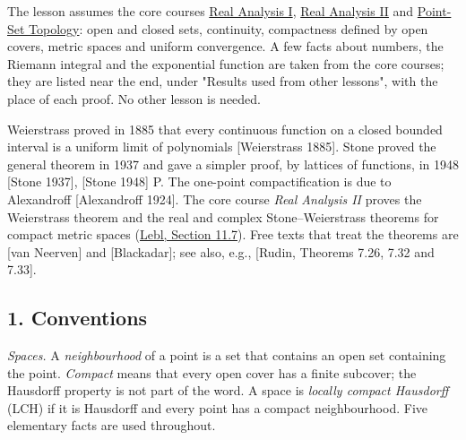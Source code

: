 \documentclass[
  english,
  11pt,
  a4paper,
]{article}
\begin{document}
The lesson assumes the core courses
\href{https://kokunoyumeto.github.io/program-matematika-indonesia/en/\#course-C10}{Real
Analysis I},
\href{https://kokunoyumeto.github.io/program-matematika-indonesia/en/\#course-C20}{Real
Analysis II} and
\href{https://kokunoyumeto.github.io/program-matematika-indonesia/en/\#course-C90}{Point-Set
Topology}: open and closed sets, continuity, compactness defined by open
covers, metric spaces and uniform convergence. A few facts about
numbers, the Riemann integral and the exponential function are taken
from the core courses; they are listed near the end, under "Results used
from other lessons", with the place of each proof. No other lesson is
needed.

Weierstrass proved in 1885 that every continuous function on a closed
bounded interval is a uniform limit of polynomials {[}Weierstrass
1885{]}. Stone proved the general theorem in 1937 and gave a simpler
proof, by lattices of functions, in 1948 {[}Stone 1937{]}, {[}Stone
1948{]} P. The one-point compactification is due to Alexandroff
{[}Alexandroff 1924{]}. The core course \emph{Real Analysis II} proves
the Weierstrass theorem and the real and complex Stone--Weierstrass
theorems for compact metric spaces
(\href{https://www.jirka.org/ra/html/sec_stoneweier.html}{Lebl, Section
11.7}). Free texts that treat the theorems are {[}van Neerven{]} and
{[}Blackadar{]}; see also, e.g., {[}Rudin, Theorems 7.26, 7.32 and
7.33{]}.

\subsection{1.
Conventions}\label{the-stone-weierstrass-theorem-for-functions-vanishing-at-infinity--1-conventions}

\emph{Spaces.} A \emph{neighbourhood} of a point is a set that contains
an open set containing the point. \emph{Compact} means that every open
cover has a finite subcover; the Hausdorff property is not part of the
word. A space is \emph{locally compact Hausdorff} (LCH) if it is
Hausdorff and every point has a compact neighbourhood. Five elementary
facts are used throughout.
\end{document}
